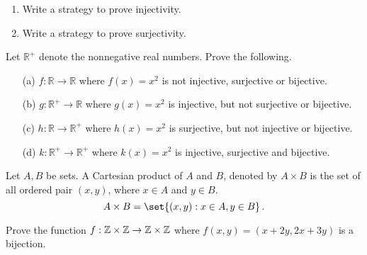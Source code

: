 \documentclass[12pt]{amsart}
\begin{document}
\begin{question}
	\begin{enumerate}
		\item Write a strategy to prove injectivity.
		      \vspace{7cm}
		\item Write a strategy to prove surjectivity.
		      \vspace{7cm}
	\end{enumerate}
\end{question}

\begin{question}
	Let $\mathbb{R}^+$ denote the nonnegative real numbers. Prove the following.

	\begin{itemize}
		\item[(a)] $f : \mathbb{R} \to \mathbb{R}$ where $f(x) = x^2$ is not injective, surjective or bijective.
		      \vspace{5cm}
		\item[(b)] $g : \mathbb{R}^+ \to \mathbb{R}$ where $g(x) = x^2$ is injective, but not surjective or bijective.
		      \vspace{5cm}
		\item[(c)] $h : \mathbb{R} \to \mathbb{R}^+$ where $h(x) = x^2$ is surjective, but not injective or bijective.
		      \vspace{5cm}
		\item[(d)] $k : \mathbb{R}^+ \to \mathbb{R}^+$ where $k(x) = x^2$ is injective, surjective and bijective.
		      \vspace{5cm}
	\end{itemize}
\end{question}


\begin{definition}
	Let $A, B$ be sets. A Cartesian product of $A$ and $B$, denoted by $A\times B$
	is the set of all ordered pair $(x,y)$, where $x\in A$ and $y \in B$.
	\begin{equation*}
		A\times B = \set{ (x,y) : x\in A, y\in B}\,.
	\end{equation*}
\end{definition}

\begin{question}
	Prove the function $f:\mathbb{Z}\times \mathbb{Z} \to \mathbb{Z}\times \mathbb{Z}$
	where
	$f(x,y) = (x+2y, 2x+3y)$
	is a bijection.
\end{question}
\end{document}
